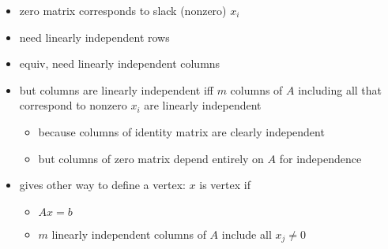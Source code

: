 \documentclass{article}
\begin{document}
\begin{itemize}
\[\begin{array}{lccccccc}
	&&1&&&&0\\
	&&&1\\
	&&&&1\\
	&&&&&1\\
	&&0&&&&1\\
	&&&&&&&1\\
	\end{array}
	\right)x
	\begin{array}{c}
	\\
	\\
	=
	\\
	\\
	\\
	\\
	\ge
	\\
	\\
	\\
	=
	\\
	\end{array}
	\left(
	\begin{array}{c}
	\\
	\\
	\\
	b
	\\
	\\
	\\
	\\
	0
	\\
	\\
	\\
	0
	\\
	\\
	\end{array}
	\right)
	\]
	\item zero matrix corresponds to slack (nonzero) $x_i$
	\item need linearly independent rows
	\item equiv, need linearly independent columns
	\item but columns are linearly independent iff $m$ columns of $A$
	including all that correspond to nonzero $x_i$ are linearly
	independent
	\begin{itemize}
		\item because columns of identity matrix are clearly independent
		\item but columns of zero matrix depend entirely on $A$ for independence
	\end{itemize}
	\item gives other way to define a vertex: $x$ is vertex if
	\begin{itemize}
		\item $Ax=b$
		\item $m$ linearly independent columns of $A$ include all $x_j \ne 0$

\end{itemize}
\end{itemize}
\end{document}
